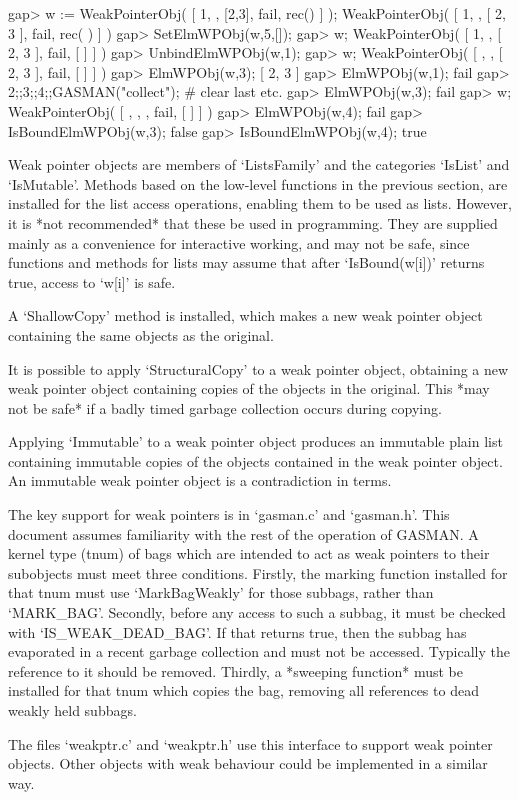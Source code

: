 \begintt
gap> w := WeakPointerObj( [ 1, , [2,3], fail, rec() ] );   
WeakPointerObj( [ 1, , [ 2, 3 ], fail, rec( ) ] )
gap> SetElmWPObj(w,5,[]);
gap> w;
WeakPointerObj( [ 1, , [ 2, 3 ], fail, [  ] ] )
gap> UnbindElmWPObj(w,1);
gap> w;
WeakPointerObj( [ , , [ 2, 3 ], fail, [  ] ] )
gap> ElmWPObj(w,3);      
[ 2, 3 ]
gap> ElmWPObj(w,1);
fail
gap> 2;;3;;4;;GASMAN("collect"); # clear last etc.
gap> ElmWPObj(w,3);          
fail
gap> w;
WeakPointerObj( [ , , , fail, [  ] ] )
gap> ElmWPObj(w,4);
fail
gap> IsBoundElmWPObj(w,3);
false
gap> IsBoundElmWPObj(w,4);
true
\endtt    
    

Weak pointer objects are members of `ListsFamily' and the categories `IsList'
and `IsMutable'.  Methods based  on  the low-level functions in  the previous
section, are  installed for the list  access operations,  enabling them to be
used as lists.    However, it is  *not recommended*  that  these be used   in
programming. They   are  supplied mainly as   a convenience  for  interactive
working, and   may not be   safe, since functions  and methods  for lists may
assume that after `IsBound(w[i])' returns true, access to `w[i]' is safe.


A `ShallowCopy'  method is installed, which  makes a  new weak pointer object
containing the same objects as the original.

It is possible to apply `StructuralCopy'  to a weak pointer object, obtaining
a new weak  pointer object containing copies of  the objects in the original. 
This *may  not  be safe*  if a  badly timed garbage  collection occurs during
copying.

Applying `Immutable'  to a weak   pointer object produces an  immutable plain
list containing immutable copies of the objects contained in the weak pointer
object. An immutable weak pointer object is a contradiction in terms.
    

The  key support for  weak  pointers is in   `gasman.c' and `gasman.h'.  This
document assumes  familiarity  with the rest of  the operation of  GASMAN.  A
kernel type (tnum) of   bags which are  intended  to act as weak  pointers to
their  subobjects must meet  three conditions.  Firstly, the marking function
installed for that tnum must  use  `MarkBagWeakly' for those subbags,  rather
than `MARK_BAG'.  Secondly,  before any access to  such a subbag, it must be
checked with `IS_WEAK_DEAD_BAG'. If that   returns true, then the subbag  has
evaporated in a recent garbage collection and must not be accessed. Typically
the reference to it should be removed. Thirdly, a *sweeping function* must be
installed for that tnum which copies the bag, removing all references to dead
weakly held subbags.

The  files `weakptr.c' and  `weakptr.h'  use this  interface  to support weak
pointer objects. Other objects with weak behaviour  could be implemented in a
similar way.


